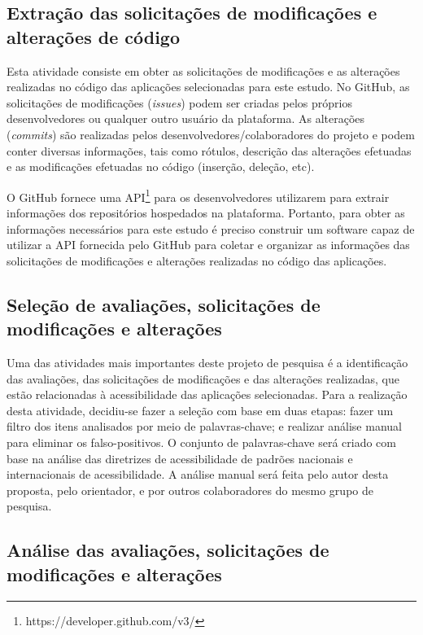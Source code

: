 \subsection{Extração das solicitações de modificações e alterações de código}
\label{sec:extracaomodificacoes}

Esta atividade consiste em obter as solicitações de modificações e as alterações realizadas no código das aplicações selecionadas para este estudo. 
No GitHub, as solicitações de modificações (\textit{issues}) podem ser criadas pelos próprios desenvolvedores ou qualquer outro usuário da plataforma.
As alterações (\textit{commits}) são realizadas pelos desenvolvedores/colaboradores do projeto e podem conter diversas informações, tais como rótulos, descrição das alterações efetuadas e as modificações efetuadas no código (inserção, deleção, etc). 

O GitHub fornece uma API\footnote{https://developer.github.com/v3/} para os desenvolvedores utilizarem para extrair informações dos repositórios hospedados na plataforma. Portanto, para obter as informações necessários para este estudo é preciso construir um software capaz de utilizar a API fornecida pelo GitHub  para coletar e organizar as informações das solicitações de modificações e alterações realizadas no código das aplicações. 

\subsection{Seleção de avaliações, solicitações de modificações e alterações}
\label{sec:selecao}

Uma das atividades mais importantes deste projeto de pesquisa é a identificação das avaliações, das solicitações de modificações e das alterações realizadas, que estão relacionadas à acessibilidade das aplicações selecionadas.
Para a realização desta atividade, decidiu-se fazer a seleção com base em duas etapas: 
fazer um filtro dos itens analisados por meio de palavras-chave; e realizar análise manual para eliminar os falso-positivos. 
O conjunto de palavras-chave será criado com base na análise das diretrizes de acessibilidade de padrões nacionais e internacionais de acessibilidade.
A análise manual será feita pelo autor desta proposta, pelo orientador, e por outros colaboradores do mesmo grupo de pesquisa. 


\subsection{Análise das avaliações, solicitações de modificações e alterações}
\label{sec:analise}

